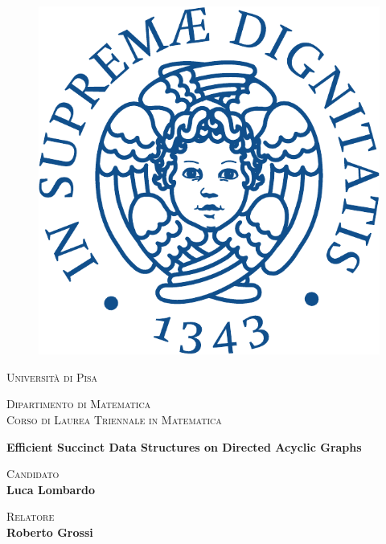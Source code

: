 \begin{titlepage}

    \begin{figure}[!htb]
        \centering
        \includegraphics[scale=0.45]{assets/cherubinFrontespizio.pdf}
    \end{figure}

    \begin{center}
        \textcolor[RGB]{2,87,144}{\textsc{\huge Università di Pisa}}\\
        \vspace{10mm}

        \large{\textsc{Dipartimento di Matematica}}\\
        \large{\textsc{Corso di Laurea Triennale in Matematica}}\\
    \end{center}
    \vfill

    \begin{center}
        {\huge{\bfseries Efficient Succinct Data Structures on Directed Acyclic Graphs}}
    \end{center}
    \vfill
    \begin{minipage}[t]{.5\textwidth}
        {\large{\scshape Candidato}{\normalsize\vspace{3mm}
                \bfseries\\ \large{Luca Lombardo}}}
    \end{minipage}
    \hfill
    \begin{minipage}[t]{.5\textwidth}\raggedleft
        {\large{\scshape Relatore}{\normalsize\vspace{3mm}
                \bfseries\\ \large{Roberto Grossi}}}
    \end{minipage}

    \vfill


\end{titlepage}

